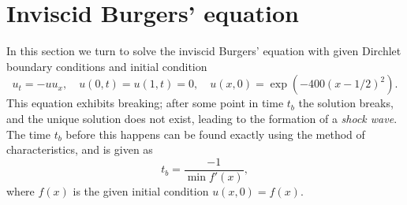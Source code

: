
%
%    

\newpage
\section{Inviscid Burgers' equation}

In this section we turn to solve the inviscid Burgers' equation with given Dirchlet boundary conditions and initial condition
\begin{equation}
    u_t = -uu_x, \quad u(0, t) = u(1, t) = 0, \quad u(x, 0) = \exp(-400(x-1/2)^2).
    \label{eq:burger}
\end{equation}
This equation exhibits breaking; 
after some point in time $t_b$ the solution breaks, 
and the unique solution does not exist, 
leading to the formation of a \textit{shock wave}.\cite{LeVeque} 
The time $t_b$ before this happens can be found exactly using the method of characteristics, 
and is given as 
\begin{equation}
    t_b = \frac{-1}{\min f'(x)}, 
    \label{eq:t_break}
\end{equation}
where $f(x)$ is the given initial condition $u(x, 0) = f(x)$.\cite{LeVeque} 

